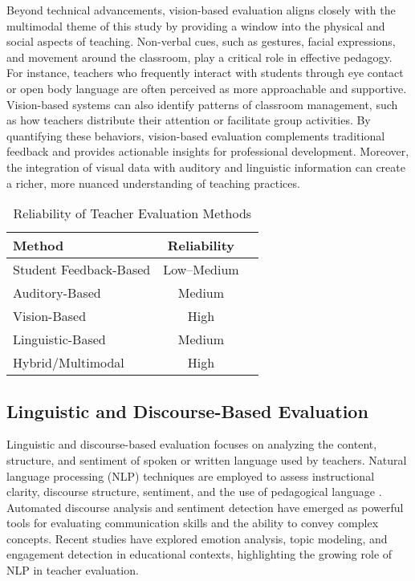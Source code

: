 Beyond technical advancements, vision-based evaluation aligns closely with the multimodal theme of this study by providing a window into the physical and social aspects of teaching. Non-verbal cues, such as gestures, facial expressions, and movement around the classroom, play a critical role in effective pedagogy. For instance, teachers who frequently interact with students through eye contact or open body language are often perceived as more approachable and supportive. Vision-based systems can also identify patterns of classroom management, such as how teachers distribute their attention or facilitate group activities. By quantifying these behaviors, vision-based evaluation complements traditional feedback and provides actionable insights for professional development. Moreover, the integration of visual data with auditory and linguistic information can create a richer, more nuanced understanding of teaching practices.


\begin{table}[t]
    \normalsize
    \centering
    \caption{ Reliability of Teacher Evaluation Methods}
    \label{tab:reliability_methods}
    \begin{tabular}{lcc}
        \toprule
        \textbf{Method} & \textbf{Reliability} \\
        \midrule
        Student Feedback-Based & Low--Medium \\
        Auditory-Based & Medium \\
        Vision-Based & High \\
        Linguistic-Based & Medium \\
        Hybrid/Multimodal & High \\
        \bottomrule
    \end{tabular}
\end{table}

\subsection{Linguistic and Discourse-Based Evaluation}
Linguistic and discourse-based evaluation focuses on analyzing the content, structure, and sentiment of spoken or written language used by teachers. Natural language processing (NLP) techniques are employed to assess instructional clarity, discourse structure, sentiment, and the use of pedagogical language \cite{falcon2024discourse, YE2023108915, inbook, fanni2023natural, rajput2020natural, kastrati2021sentiment, jim2024recent, plaza2024emotion, karabacak2024text}. Automated discourse analysis and sentiment detection have emerged as powerful tools for evaluating communication skills and the ability to convey complex concepts. Recent studies have explored emotion analysis, topic modeling, and engagement detection in educational contexts, highlighting the growing role of NLP in teacher evaluation.

